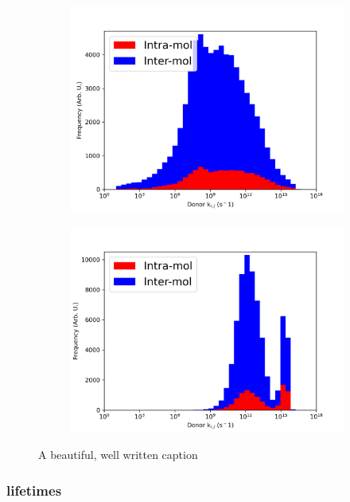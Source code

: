 \begin{figure}[b]
\begin{subfigure}{.5\textwidth}
\end{subfigure}
\begin{subfigure}{.5\textwidth}
    \centering
    \includegraphics[width=\textwidth]{figures/donor_hopping_rate_clusters_temp100.png}
\end{subfigure}%
\begin{subfigure}{.5\textwidth}
    \centering
    \includegraphics[width=\textwidth]{figures/donor_hopping_rate_clusters_temp800.png}
\end{subfigure}
\caption[short]{A beautiful, well written caption}
\end{figure}

\subsubsection{lifetimes}


